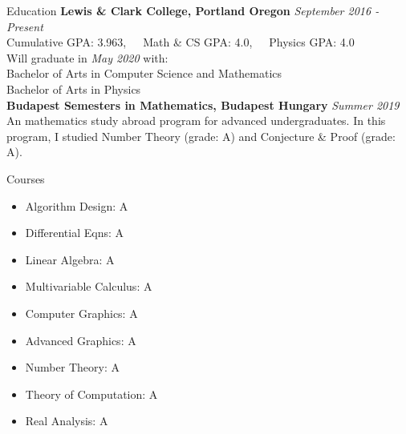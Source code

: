 \documentclass{resume}
\begin{document}
\begin{rSection}{Education}
    \textbf{Lewis \& Clark College, Portland Oregon} \hfill \textit{September 2016 -
    Present}\\
    Cumulative GPA: 3.963,\ \ \ Math \& CS GPA: 4.0,\ \ \  Physics GPA:
    4.0\\
    Will graduate in \textit{May 2020} with:\\
    Bachelor of Arts in Computer Science and Mathematics\\
    Bachelor of Arts in Physics\\
    \textbf{Budapest Semesters in Mathematics, Budapest Hungary} \hfill \textit{Summer 2019}\\
    An mathematics study abroad program for advanced undergraduates. In this program, I studied Number Theory (grade: A) and Conjecture \& Proof (grade: A).
\end{rSection}
\begin{rSection}{Courses}
    \vspace{-1mm}
    \begin{multicols}{3}
        \begin{itemize}[topsep=0pt,itemsep=0pt,parsep=0pt,before=\vspace{1cm},after=\vspace{1mm}]
            \item Algorithm Design: A
            \item Differential Eqns: A
            \item Linear Algebra: A
            \item Multivariable Calculus: A
            \item Computer Graphics: A
            \item Advanced Graphics: A
            \item Number Theory: A
            \item Theory of Computation: A
            \item Real Analysis: A
        \end{itemize}
        \vspace{-3mm}
    \end{multicols}
    \vspace{-3mm}
\end{rSection}
\end{document}

